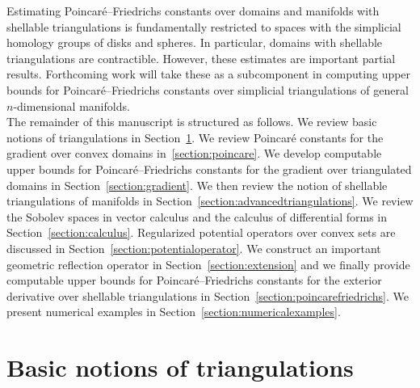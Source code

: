 \documentclass[10pt,letterpaper]{article}
\begin{document}
Estimating Poincar\'e--Friedrichs constants over domains and manifolds with shellable triangulations is fundamentally restricted to spaces with the simplicial homology groups of disks and spheres. In particular, domains with shellable triangulations are contractible. However, these estimates are important partial results. Forthcoming work will take these as a subcomponent in computing upper bounds for Poincar\'e--Friedrichs constants over simplicial triangulations of general $n$-dimensional manifolds. 
\\




The remainder of this manuscript is structured as follows.
We review basic notions of triangulations in Section~\ref{section:triangulations}.
We review Poincar\'e constants for the gradient over convex domains in~\ref{section:poincare}.
We develop computable upper bounds for Poincar\'e--Friedrichs constants for the gradient over triangulated domains in Section~\ref{section:gradient}.
We then review the notion of shellable triangulations of manifolds in Section~\ref{section:advancedtriangulations}.
We review the Sobolev spaces in vector calculus and the calculus of differential forms in Section~\ref{section:calculus}.
Regularized potential operators over convex sets are discussed in Section~\ref{section:potentialoperator}.
We construct an important geometric reflection operator in Section~\ref{section:extension}
and we finally provide computable upper bounds for Poincar\'e--Friedrichs constants for the exterior derivative over shellable triangulations in Section~\ref{section:poincarefriedrichs}.
We present numerical examples in Section~\ref{section:numericalexamples}. 






































\section{Basic notions of triangulations}\label{section:triangulations}
\end{document}
